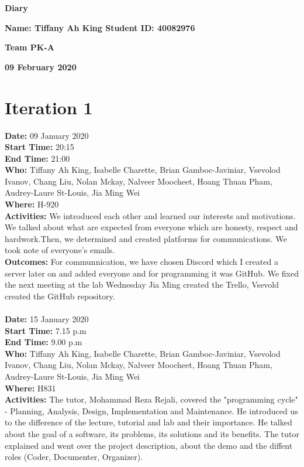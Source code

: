 \documentclass[12pt]{article}
\begin{document}
\vspace*{0.2in}
\centerline{\bf\Large Diary}

\vspace*{0.2in}
\centerline{\bf\Large Name: Tiffany Ah King  Student ID: 40082976}

\vspace*{0.2in}
\centerline{\bf\Large Team PK-A}

\vspace*{0.2in}
\centerline{\bf\Large 09 February 2020}

\section{Iteration 1}

{\bf Date:} 09 January 2020\\
{\bf Start Time:} 20:15\\
{\bf End Time:} 21:00 \\
{\bf Who:} Tiffany Ah King, Isabelle Charette, Brian Gamboc-Javiniar, Vsevolod Ivanov,
Chang Liu, Nolan Mckay, Nalveer Moocheet, Hoang Thuan Pham, Audrey-Laure St-Louis, Jia Ming Wei\\
{\bf Where:} H-920 \\
{\bf Activities:} We introduced each other and learned our interests and motivations. We talked about what are expected from everyone which are honesty, respect and hardwork.Then, we determined and created platforms for communications. We took note of everyone's emails.\\
{\bf Outcomes:} For communnication, we have chosen Discord which I created a server later on and added everyone and for programming it was GitHub. We fixed the next meeting at the lab Wednesday Jia Ming created the Trello, Vsevold created the GitHub repository.\\ \\


{\bf Date:} 15 January 2020\\
{\bf Start Time:} 7.15 p.m\\
{\bf End Time:} 9.00 p.m\\
{\bf Who:}  Tiffany Ah King, Isabelle Charette, Brian Gamboc-Javiniar, Vsevolod Ivanov,
Chang Liu, Nolan Mckay, Nalveer Moocheet, Hoang Thuan Pham, Audrey-Laure St-Louis, Jia Ming Wei \\
{\bf Where:} H831 \\
{\bf Activities:} The tutor, Mohammad Reza Rejali, covered the "programming cycle" - Planning, Analysis, Design, Implementation and Maintenance. He introduced us to the difference of the lecture, tutorial and lab and their importance. He talked about the goal of a software, its problems, its solutions and its benefits. The tutor explained and went over the project description, about the demo and the diffent roles (Coder, Documenter, Organizer).\\
\end{document}
